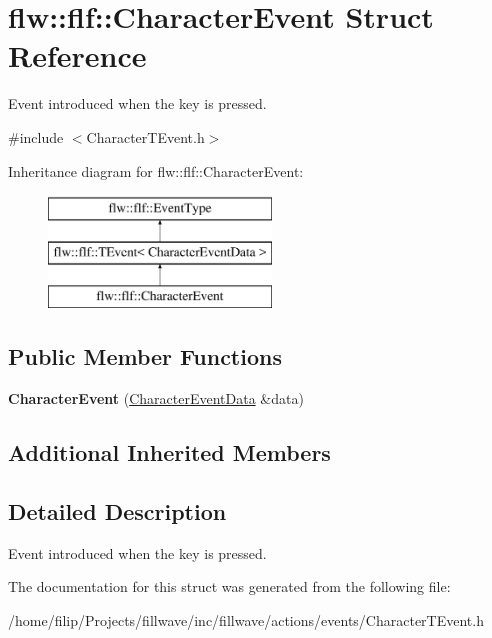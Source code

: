 \hypertarget{classflw_1_1flf_1_1CharacterEvent}{}\section{flw\+:\+:flf\+:\+:Character\+Event Struct Reference}
\label{classflw_1_1flf_1_1CharacterEvent}


Event introduced when the key is pressed.  




{\ttfamily \#include $<$Character\+T\+Event.\+h$>$}

Inheritance diagram for flw\+:\+:flf\+:\+:Character\+Event\+:\begin{figure}[H]
\begin{center}
\leavevmode
\includegraphics[height=3.000000cm]{classflw_1_1flf_1_1CharacterEvent}
\end{center}
\end{figure}
\subsection*{Public Member Functions}
\begin{DoxyCompactItemize}
\item 
{\bfseries Character\+Event} (\hyperlink{structflw_1_1flf_1_1CharacterEventData}{Character\+Event\+Data} \&data)\hypertarget{classflw_1_1flf_1_1CharacterEvent_a508be13f56ac32c57af8db79860aead4}{}\label{classflw_1_1flf_1_1CharacterEvent_a508be13f56ac32c57af8db79860aead4}

\end{DoxyCompactItemize}
\subsection*{Additional Inherited Members}


\subsection{Detailed Description}
Event introduced when the key is pressed. 

The documentation for this struct was generated from the following file\+:\begin{DoxyCompactItemize}
\item 
/home/filip/\+Projects/fillwave/inc/fillwave/actions/events/Character\+T\+Event.\+h\end{DoxyCompactItemize}
